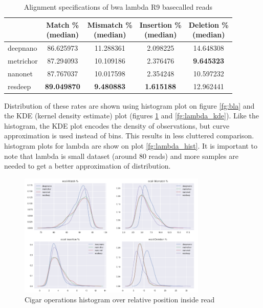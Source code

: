 \documentclass[times, utf8, diplomski, numeric, english]{fer}
\begin{document}
\begin{table}[htb]
	\caption{Alignment specifications of bwa lambda R9 basecalled reads}
	\label{tbl:lambda_rates}
	\centering
	\begin{tabular}{lcccc}
		\toprule
		{} &  \thead{Match \% \\(median)} &  \thead{Mismatch \% \\(median)} &  \thead{Insertion \% \\(median)} &  \thead{Deletion \% \\(median)} \\
		\midrule
		
		deepnano   &                  86.625973 &                     11.288361 &                       2.098225 &                     14.648308 \\
		metrichor  &                  87.294093 &                     10.109186 &                       2.376476 &                      \textbf{9.645323 }\\
		nanonet    &                  87.767037 &                     10.017598 &                       2.354248 &                     10.597232 \\
		resdeep    &                 \textbf{ 89.049870} &                     \textbf{ 9.480883} &                       \textbf{1.615188 }&                     12.962441 \\
		\bottomrule
	\end{tabular}
	
\end{table}
Distribution of these rates are shown using  histogram plot on figure \ref{fg:bla} and the KDE (kernel density estimate) plot (figures \ref{fg:ecoli_kde} and \ref{fg:lambda_kde}). Like the histogram, the KDE plot encodes the density of observations, but curve approximation is used instead of bins. This results in less cluttered comparison. 
histogram plots for lambda are show on plot \ref{fg:lambda_hist}. It is important to note that lambda is small dataset (around 80 reads) and more samples are needed to get a better approximation of distribution.


\begin{figure}[!htb]
	\begin{center}
		\includegraphics[width=0.8\textwidth]{./imgs/results/ecoli/kde_cigar_small.png}
		\caption{Cigar operations histogram over relative position inside read}
		\label{fg:ecoli_kde}
	\end{center}
\end{figure}
\end{document}
